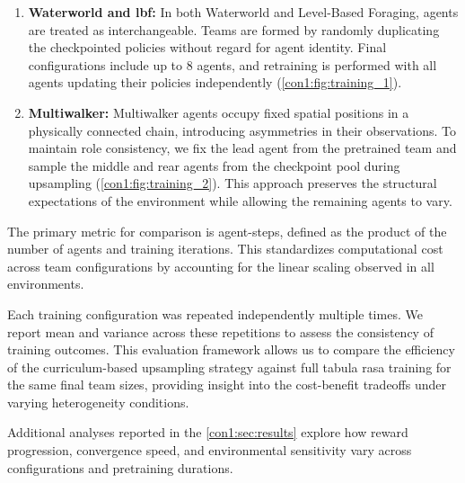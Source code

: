 \begin{enumerate}
    \item \textbf{Waterworld and \gls{lbf}:}
    In both Waterworld and Level-Based Foraging, agents are treated as interchangeable. 
    Teams are formed by randomly duplicating the checkpointed policies without regard 
    for agent identity. Final configurations include up to 8 agents, and retraining is 
    performed with all agents updating their policies independently (\cref{con1:fig:training_1}).
    \item \textbf{Multiwalker:}
    Multiwalker agents occupy fixed spatial positions in a physically connected chain, 
    introducing asymmetries in their observations. To maintain role consistency, 
    we fix the lead agent from the pretrained team and sample the middle and rear 
    agents from the checkpoint pool during upsampling (\cref{con1:fig:training_2}). 
    This approach preserves the structural expectations of the environment while 
    allowing the remaining agents to vary. 
\end{enumerate}

The primary metric for comparison is agent-steps, defined as the product of the number of 
agents and training iterations. This standardizes computational cost across team configurations 
by accounting for the linear scaling observed in all environments.

Each training configuration was repeated independently multiple times. We report mean and 
variance across these repetitions to assess the consistency of training outcomes. 
This evaluation framework allows us to compare the efficiency of the curriculum-based 
upsampling strategy against full tabula rasa training for the same final team sizes, 
providing insight into the cost-benefit tradeoffs under varying heterogeneity conditions.

Additional analyses reported in the \cref{con1:sec:results} explore how reward progression, 
convergence speed, and environmental sensitivity vary across configurations and 
pretraining durations.

